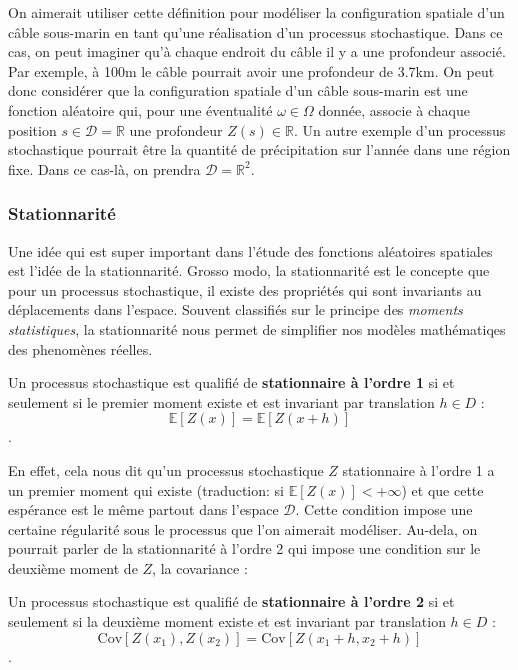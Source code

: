\documentclass[10pt]{article} %
\begin{document}
On aimerait utiliser cette définition pour modéliser la configuration spatiale d'un câble sous-marin en tant qu'une réalisation d'un processus stochastique.
Dans ce cas, on peut imaginer qu'à chaque endroit du câble il y a une profondeur associé. Par exemple, à 100m le câble pourrait avoir une profondeur de 3.7km. On peut donc
considérer que la configuration spatiale d'un câble sous-marin est une fonction aléatoire qui, pour une éventualité $\omega \in \Omega$ donnée, associe à chaque position
$s \in \mathcal{D} = \mathbb{R}$ une profondeur $Z(s) \in \mathbb{R}$. Un autre exemple d'un processus stochastique pourrait être la quantité de précipitation sur l'année dans une région fixe. Dans ce cas-là, on prendra $\mathcal{D} = \mathbb{R}^2$.

\subsubsection{Stationnarité}

Une idée qui est super important dans l'étude des fonctions aléatoires spatiales est l'idée de la stationnarité. Grosso modo, la stationnarité est le concepte que pour un processus stochastique,
il existe des propriétés qui sont invariants au déplacements dans l'espace. Souvent classifiés sur le principe des \textit{moments statistiques}, la stationnarité nous permet de simplifier nos modèles mathématiqes des
phenomènes réelles.

\begin{definition}
    Un processus stochastique est qualifié de \textbf{stationnaire à l'ordre 1} si et seulement si le premier moment existe et est invariant par translation $h \in D$ :
    $$ \mathbb{E}[Z(x)] = \mathbb{E}[Z(x + h)]$$.
\end{definition}

En effet, cela nous dit qu'un processus stochastique $Z$ stationnaire à l'ordre 1 a un premier moment qui existe (traduction: si $\mathbb{E}[Z(x)] < +\infty$) et que cette espérance
est le même partout dans l'espace $\mathcal{D}$. Cette condition impose une certaine régularité sous le processus que l'on aimerait modéliser. Au-dela, on pourrait parler de la stationnarité
à l'ordre 2 qui impose une condition sur le deuxième moment de $Z$, la covariance :

\begin{definition}
    Un processus stochastique est qualifié de \textbf{stationnaire à l'ordre 2} si et seulement si la deuxième moment existe et est invariant par translation $h \in D$ :
    $$ \mathrm{Cov}[Z(x_1), Z(x_2)] = \mathrm{Cov}[Z(x_1 + h, x_2 + h)]$$.
\end{definition}
\end{document}
